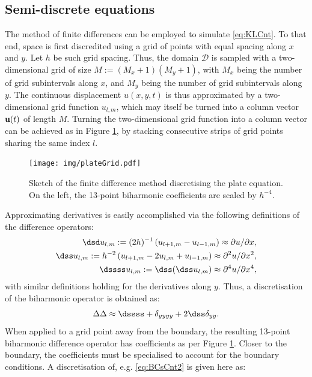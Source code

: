 \subsection{Semi-discrete equations}

The method of finite differences can be employed to simulate \eqref{eq:KLCnt}. To that end, space is first discredited using a grid of points with equal spacing along $x$ and $y$. Let $h$ be such grid spacing. Thus, the domain $\mathcal D$ is sampled with a two-dimensional grid of size $M:=(M_x+1)(M_y+1)$, with $M_x$ being the number of grid subintervals along $x$, and $M_y$ being the number of grid subintervals along $y$. The continuous displacement $u(x,y,t)$ is thus approximated by a two-dimensional grid function $u_{l,m}$, which may itself be turned into a column vector ${\bf u}(t)$ of length $M$. Turning the two-dimensional grid function into a column vector can be achieved as in Figure \ref{fig:PlateFD}, by stacking consecutive strips of grid points sharing the same index $l$.
\begin{figure}
\centering
\texttt{[image: img/plateGrid.pdf]}
\caption{Sketch of the finite difference method discretising the plate equation. On the left, the 13-point biharmonic coefficients are scaled by $h^{-4}$\cite{tee_novel_1963}.}\label{fig:PlateFD}
\end{figure}
Approximating derivatives is easily accomplished via the following definitions of the difference operators:
\begin{subequations}
\begin{align}
\dsd u_{l,m} := (2h)^{-1}\left(u_{{l+1},m} - u_{{l-1},m} \right) \approx \partial u / \partial x, \\ 
\dss u_{l,m} := h^{-2}\left(u_{{l+1},m} - 2u_{l,m} + u_{{l-1},m} \right) \approx \partial^2 u / \partial x^2,\\ 
\dssss u_{l,m} := \dss (\dss u_{l,m}) \approx \partial^4 u / \partial x^4,
\end{align}
\end{subequations}
with similar definitions holding for the derivatives along $y$. Thus, a discretisation of the biharmonic operator is obtained as:
\begin{equation}
\Delta\Delta \approx \dssss + \delta_{yyyy} + 2\dss\delta_{yy}.
\end{equation}
When applied to a grid point away from the boundary, the resulting 13-point biharmonic difference operator has coefficients as per Figure \ref{fig:PlateFD}. Closer to the boundary, the coefficients must be specialised to account for the boundary conditions. A discretisation of, e.g. \eqref{eq:BCsCnt2} is given here as:
